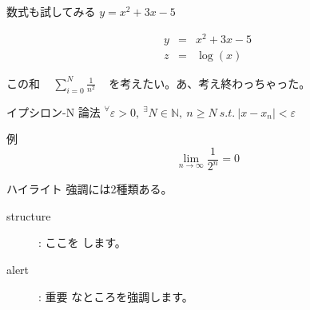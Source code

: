 \documentclass[dvipdfmx]{beamer}  %
\begin{document}
\begin{frame}{数式も試してみる}
  $y = x^2 + 3x -5$

  \begin{eqnarray*}
    y &=& x^2 + 3x -5 \\
    z &=& \log(x)
  \end{eqnarray*}

  この和 ~ $ {\displaystyle
    \sum_{i=0}^{N} \frac{1}{n^2}
  } $ ~ を考えたい。あ、考え終わっちゃった。

  \begin{block}{ イプシロン-N 論法 }
    $ {\displaystyle
      {}^{\forall} \varepsilon > 0, ~ {}^{\exists} N \in \mathbb{N}, ~ n \geq N ~
      s.t. ~ | x - x_n | < \varepsilon
    } $
  \end{block}

  \begin{exampleblock}{例}
    \begin{displaymath}
      \lim_{n \rightarrow \infty} \frac{1}{2^n} = 0
    \end{displaymath}
  \end{exampleblock}

\end{frame}

\begin{frame}{ハイライト}
  強調には2種類ある。

  \begin{description}
    \item[structure]: ここを  します。
    \item[alert]: \alert{重要} なところを強調します。
  \end{description}
\end{frame}
\end{document}
